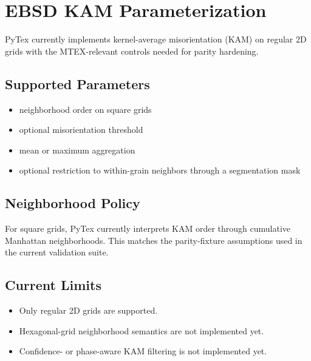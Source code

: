 \section{EBSD KAM Parameterization}

PyTex currently implements kernel-average misorientation (KAM) on regular 2D grids with the MTEX-relevant controls needed for parity hardening.

\subsection{Supported Parameters}

\begin{itemize}
  \item neighborhood order on square grids
  \item optional misorientation threshold
  \item mean or maximum aggregation
  \item optional restriction to within-grain neighbors through a segmentation mask
\end{itemize}

\subsection{Neighborhood Policy}

For square grids, PyTex currently interprets KAM order through cumulative Manhattan neighborhoods. This matches the parity-fixture assumptions used in the current validation suite.

\subsection{Current Limits}

\begin{itemize}
  \item Only regular 2D grids are supported.
  \item Hexagonal-grid neighborhood semantics are not implemented yet.
  \item Confidence- or phase-aware KAM filtering is not implemented yet.
\end{itemize}
